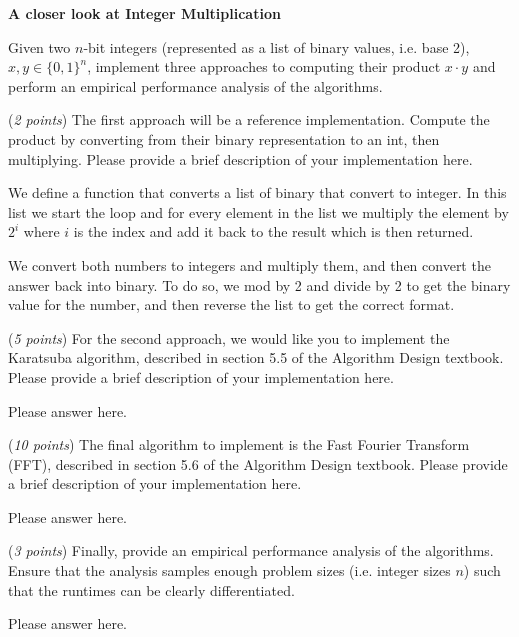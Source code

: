 \documentclass{hw}
\begin{document}
\begin{challenge}
    \textbf{A closer look at Integer Multiplication}
    
    Given two $n$-bit integers (represented as a list of binary values, i.e. base 2), $x, y\in\{0,1\}^n$,
    implement three approaches to computing their product $x \cdot y$
    and perform an empirical performance analysis of the algorithms.

    (\textit{2 points}) The first approach will be a reference implementation. Compute the product by converting from their binary representation to an int, then multiplying. Please provide a brief description of your implementation here.
    
    \begin{solution}
        We define a function that converts a list of binary that convert to integer. In this list we start the loop and for every element in the list we multiply the element by $2^i$ where $i$ is the index and add it back to the result which is then returned.

        We convert both numbers to integers and multiply them, and then convert the answer back into binary. To do so, we mod by 2 and divide by 2 to get the binary value for the number, and then reverse the list to get the correct format.
    \end{solution}

    (\textit{5 points}) For the second approach,
    we would like you to implement the Karatsuba algorithm,
    described in section 5.5 of the Algorithm Design textbook.
    Please provide a brief description of your implementation here.

    \begin{solution}
        Please answer here.
    \end{solution}

    (\textit{10 points}) The final algorithm to implement is the Fast Fourier Transform (FFT), described in
    section 5.6 of the Algorithm Design textbook.
    Please provide a brief description of your implementation here.

    \begin{solution}
        Please answer here.
    \end{solution}


    (\textit{3 points}) Finally, provide an empirical performance analysis of the algorithms.
    Ensure that the analysis samples enough problem sizes (i.e. integer sizes $n$)
    such that the runtimes can be clearly differentiated.
    
    \begin{solution}
        Please answer here.
    \end{solution}

\end{challenge}
\end{document}
